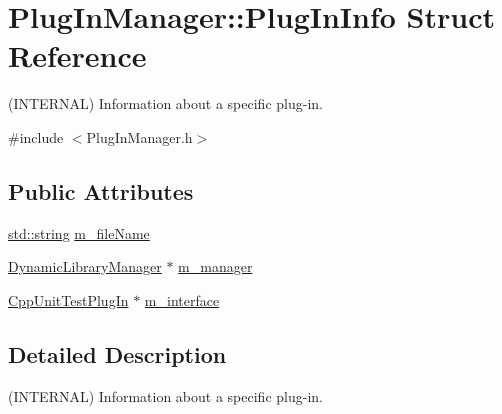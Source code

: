 \hypertarget{struct_plug_in_manager_1_1_plug_in_info}{\section{Plug\-In\-Manager\-:\-:Plug\-In\-Info Struct Reference}
\label{struct_plug_in_manager_1_1_plug_in_info}
}


(I\-N\-T\-E\-R\-N\-A\-L) Information about a specific plug-\/in.  




{\ttfamily \#include $<$Plug\-In\-Manager.\-h$>$}

\subsection*{Public Attributes}
\begin{DoxyCompactItemize}
\item 
\hyperlink{glew_8h_ae84541b4f3d8e1ea24ec0f466a8c568b}{std\-::string} \hyperlink{struct_plug_in_manager_1_1_plug_in_info_ac084e2efe4d9953812eff03966c06988}{m\-\_\-file\-Name}
\item 
\hyperlink{class_dynamic_library_manager}{Dynamic\-Library\-Manager} $\ast$ \hyperlink{struct_plug_in_manager_1_1_plug_in_info_a1889712db485e16a29c45ecba4780f0a}{m\-\_\-manager}
\item 
\hyperlink{struct_cpp_unit_test_plug_in}{Cpp\-Unit\-Test\-Plug\-In} $\ast$ \hyperlink{struct_plug_in_manager_1_1_plug_in_info_a306eb58a5d6881b117d6bb9a9ae46589}{m\-\_\-interface}
\end{DoxyCompactItemize}


\subsection{Detailed Description}
(I\-N\-T\-E\-R\-N\-A\-L) Information about a specific plug-\/in. 

